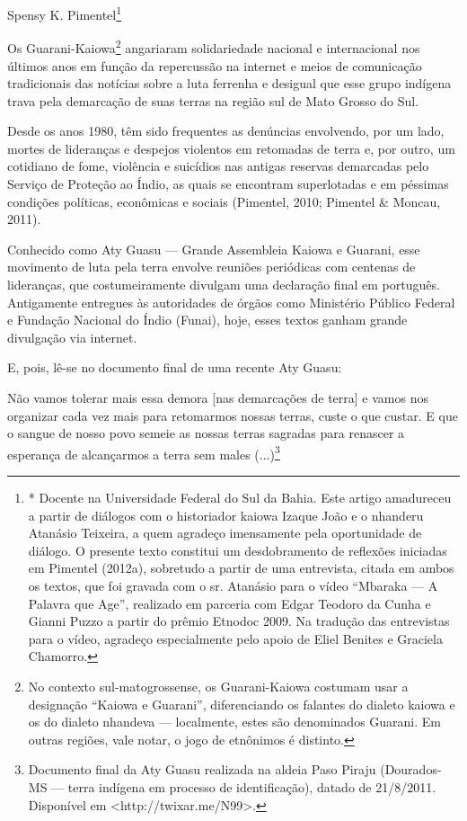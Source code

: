 \documentclass{article}
\begin{document}
Spensy K. Pimentel\footnote{* Docente na Universidade Federal do Sul da
Bahia. Este artigo amadureceu a partir de di\'alogos com o historiador
kaiowa Izaque Jo\~ao e o nhanderu Atan\'asio Teixeira, a quem
agrade\c{c}o imensamente pela oportunidade de di\'alogo. O presente
texto constitui um desdobramento de reflex\~oes iniciadas em Pimentel
(2012a), sobretudo a partir de uma entrevista, citada em ambos os
textos, que foi gravada com o sr. Atan\'asio para o v\'ideo
{\textquotedblleft}Mbaraka --- A Palavra que Age{\textquotedblright},
realizado em parceria com Edgar Teodoro da Cunha e Gianni Puzzo a
partir do pr\^emio Etnodoc 2009. Na tradu\c{c}\~ao das entrevistas para
o v\'ideo, agrade\c{c}o especialmente pelo apoio de Eliel Benites e
Graciela Chamorro.} 

Os Guarani-Kaiowa\footnote{ No contexto sul-matogrossense, os
Guarani-Kaiowa costumam usar a designa\c{c}\~ao
{\textquotedblleft}Kaiowa e Guarani{\textquotedblright}, diferenciando
os falantes do dialeto kaiowa e os do dialeto nhandeva --- localmente,
estes s\~ao denominados Guarani. Em outras regi\~oes, vale notar, o
jogo de etn\^onimos \'e distinto.} angariaram solidariedade nacional e
internacional nos \'ultimos anos em fun\c{c}\~ao da repercuss\~ao na
internet e meios de comunica\c{c}\~ao tradicionais das not\'icias sobre
a luta ferrenha e desigual que esse grupo ind\'igena trava pela
demarca\c{c}\~ao de suas terras na regi\~ao sul de Mato Grosso do Sul.

Desde os anos 1980, t\^em sido frequentes as den\'uncias envolvendo, por
um lado, mortes de lideran\c{c}as e despejos violentos em retomadas de
terra e, por outro, um cotidiano de fome, viol\^encia e suic\'idios nas
antigas reservas demarcadas pelo Servi\c{c}o de Prote\c{c}\~ao ao
\'Indio, as quais se encontram superlotadas e em p\'essimas
condi\c{c}\~oes pol\'iticas, econ\^omicas e sociais (Pimentel, 2010;
Pimentel \& Moncau, 2011).

Conhecido como Aty Guasu --- Grande Assembleia Kaiowa e Guarani, esse
movimento de luta pela terra envolve reuni\~oes peri\'odicas com
centenas de lideran\c{c}as, que costumeiramente divulgam uma
declara\c{c}\~ao final em portugu\^es. Antigamente entregues \`as
autoridades de \'org\~aos como Minist\'erio P\'ublico Federal e
Funda\c{c}\~ao Nacional do \'Indio (Funai), hoje, esses textos ganham
grande divulga\c{c}\~ao via internet.

E, pois, l\^e-se no documento final de uma recente Aty Guasu:

N\~ao vamos tolerar mais essa demora [nas demarca\c{c}\~oes de terra] e
vamos nos organizar cada vez mais para retomarmos nossas terras, custe
o que custar. E que o sangue de nosso povo semeie as nossas terras
sagradas para renascer a esperan\c{c}a de alcan\c{c}armos a terra sem
males (...)\footnote{ Documento final da Aty Guasu realizada na aldeia
Paso Piraju (Dourados-MS --- terra ind\'igena em processo de
identifica\c{c}\~ao), datado de 21/8/2011. Dispon\'ivel em
{\textless}http://twixar.me/N99{\textgreater}.}
\end{document}
